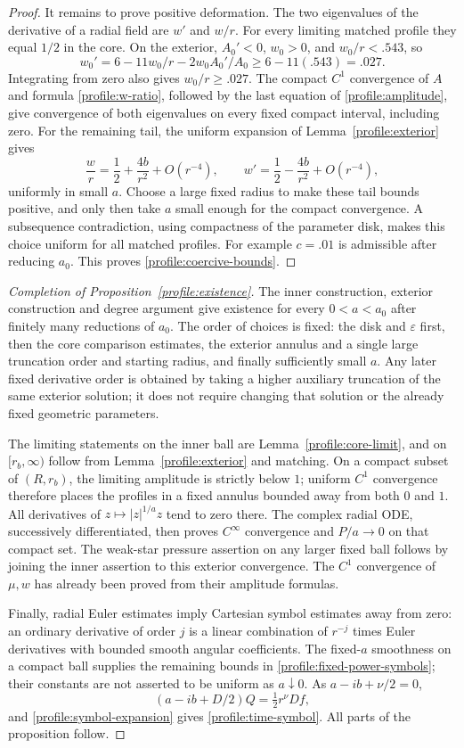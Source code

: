 \begin{proof}
It remains to prove positive deformation.  The two eigenvalues of the
derivative of a radial field are $w'$ and $w/r$.  For every limiting
matched profile they equal $1/2$ in the core.  On the exterior,
$A_0'<0$, $w_0>0$, and $w_0/r<.543$, so
\[
 w_0'=6-11w_0/r-2w_0A_0'/A_0\ge6-11(.543)=.027.
\]
Integrating from zero also gives $w_0/r\ge.027$.  The compact $C^1$
convergence of $A$ and formula \eqref{profile:w-ratio}, followed by
the last equation of \eqref{profile:amplitude}, give convergence of
both eigenvalues on every fixed compact interval, including zero.
For the remaining tail, the uniform expansion of Lemma~\ref{profile:exterior}
gives
\[
 \frac wr=\frac12+\frac{4b}{r^2}+O(r^{-4}),\qquad
 w'=\frac12-\frac{4b}{r^2}+O(r^{-4}),
\]
uniformly in small $a$.  Choose a large fixed radius to make these tail
bounds positive, and only then take $a$ small enough for the compact
convergence.  A subsequence contradiction, using compactness of the
parameter disk, makes this choice uniform for all matched profiles.
For example $c=.01$ is admissible after reducing $a_0$.  This proves
\eqref{profile:coercive-bounds}.
\end{proof}

\begin{proof}[Completion of Proposition~\ref{profile:existence}]
The inner construction, exterior construction and degree argument give
existence for every $0<a<a_0$ after finitely many reductions of $a_0$.
The order of choices is fixed: the disk and $\varepsilon$ first, then
the core comparison estimates, the exterior annulus and a single large
truncation order and starting radius, and finally sufficiently small
$a$.  Any later fixed derivative order is obtained by taking a higher
auxiliary truncation of the same exterior solution; it does not require
changing that solution or the already fixed geometric parameters.

The limiting statements on the inner ball are
Lemma~\ref{profile:core-limit}, and on $[r_b,\infty)$ follow from
Lemma~\ref{profile:exterior} and matching.  On a compact subset of
$(R,r_b)$, the limiting amplitude is strictly below $1$; uniform
$C^1$ convergence therefore places the profiles in a fixed annulus
bounded away from both $0$ and $1$.  All derivatives of
$z\mapsto|z|^{1/a}z$ tend to zero there.  The complex radial ODE,
successively differentiated, then proves $C^\infty$ convergence and
$P/a\to0$ on that compact set.  The weak-star pressure assertion on
any larger fixed ball follows by joining the inner assertion to this
exterior convergence.  The $C^1$ convergence of $\mu,w$ has already
been proved from their amplitude formulas.

Finally, radial Euler estimates imply Cartesian symbol estimates away
from zero: an ordinary derivative of order $j$ is a linear combination
of $r^{-j}$ times Euler derivatives with bounded smooth angular
coefficients.  The fixed-$a$ smoothness on a compact ball supplies the
remaining bounds in \eqref{profile:fixed-power-symbols}; their constants
are not asserted to be uniform as $a\downarrow0$.  As
$a-ib+\nu/2=0$,
\[
 (a-ib+D/2)Q=\tfrac12r^\nu Df,
\]
and \eqref{profile:symbol-expansion} gives
\eqref{profile:time-symbol}.  All parts of the proposition follow.
\end{proof}

